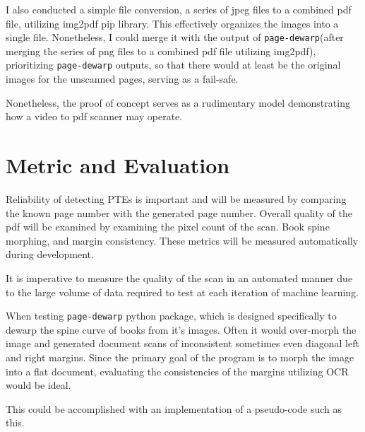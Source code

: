 \documentclass[10pt,twocolumn]{article}
\begin{document}
I also conducted a simple file conversion, a series of jpeg files to a combined pdf file, utilizing img2pdf pip library. This effectively organizes the images into a single file. Nonetheless, I could merge it with the output of \texttt{page-dewarp}(after merging the series of png files to a combined pdf file utilizing img2pdf), prioritizing \texttt{page-dewarp} outputs, so that there would at least be the original images for the unscanned pages, serving as a fail-safe.\newline

Nonetheless, the proof of concept serves as a rudimentary model demonstrating how a video to pdf scanner may operate.\newline

\section{Metric and Evaluation}

Reliability of detecting PTEs is important and will be measured by comparing the known page number with the generated page number. Overall quality of the pdf will be examined by examining the pixel count of the scan. Book spine morphing, and margin consistency. These metrics will be measured automatically during development.\newline

It is imperative to measure the quality of the scan in an automated manner due to the large volume of data required to test at each iteration of machine learning.\newline

When testing \texttt{page-dewarp} python package, which is designed specifically to dewarp the spine curve of books from it's images. Often it would over-morph the image and generated document scans of inconsistent sometimes even diagonal left and right margins. Since the primary goal of the program is to morph the image into a flat document, evaluating the consistencies of the margins utilizing OCR would be ideal.\newline

This could be accomplished with an implementation of a pseudo-code such as this.\newline

\newline
{}\newline
   
\end{document}
